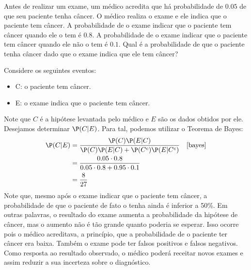 \begin{example}
 \label{exemplo:exame}
 Antes de realizar um exame, 
 um médico acredita que há probabilidade de 
 $0.05$ de que seu paciente tenha câncer.
 O médico realiza o exame e ele indica que
 o paciente tem câncer.
 A probabilidade de o exame indicar que 
 o paciente tem câncer quando ele o tem é $0.8$.
 A probabilidade de o exame indicar que 
 o paciente tem câncer quando
 ele não o tem é $0.1$.
 Qual é a probabilidade de que o paciente tenha
 câncer dado que o exame indica que
 ele tem câncer?

 Considere os seguintes eventos:
 \begin{itemize}
  \item C: o paciente tem câncer.
  \item E: o exame indica que o paciente tem câncer.
 \end{itemize}
 Note que $C$ é a hipótese levantada pelo médico e
 $E$ são os dados obtidos por ele. 
 Desejamos determinar $\P(C|E)$.
 Para tal, podemos utilizar o Teorema de Bayes:
 \begin{align*}
  \P(C|E)
  &= \frac{\P(C)\P(E|C)}
  {\P(C)\P(E|C) +\P(C^{c})\P(E|C^{c})}
  & \Cref{bayes} \\
  &= \frac{0.05 \cdot 0.8}
  {0.05 \cdot 0.8 + 0.95 \cdot 0.1} \\
  &= \frac{8}{27} 
 \end{align*}
 Note que, mesmo após o exame indicar que 
 o paciente tem câncer, a 
 probabilidade de que o paciente de fato o 
 tenha ainda é inferior a 50\%.
 Em outras palavras, o resultado do exame aumenta a
 probabilidade da hipótese de câncer, mas 
 o aumento não é tão grande quanto poderia se esperar.
 Isso ocorre pois o médico acreditava, a princípio, 
 que a probabilidade de o paciente ter câncer era baixa.
 Também o exame pode ter 
 falsos positivos e falsos negativos.
 Como resposta ao resultado observado, 
 o médico poderá receitar novos exames
 e assim reduzir a sua incerteza sobre o diagnóstico.
\end{example}

